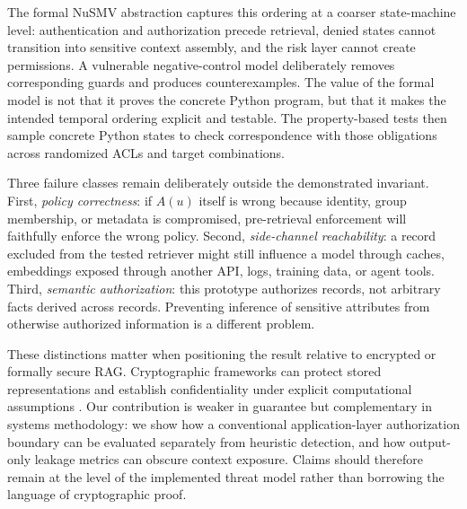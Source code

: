 The formal NuSMV abstraction captures this ordering at a coarser state-machine level: authentication and authorization precede retrieval, denied states cannot transition into sensitive context assembly, and the risk layer cannot create permissions. A vulnerable negative-control model deliberately removes corresponding guards and produces counterexamples. The value of the formal model is not that it proves the concrete Python program, but that it makes the intended temporal ordering explicit and testable. The property-based tests then sample concrete Python states to check correspondence with those obligations across randomized ACLs and target combinations.

Three failure classes remain deliberately outside the demonstrated invariant. First, \emph{policy correctness}: if $A(u)$ itself is wrong because identity, group membership, or metadata is compromised, pre-retrieval enforcement will faithfully enforce the wrong policy. Second, \emph{side-channel reachability}: a record excluded from the tested retriever might still influence a model through caches, embeddings exposed through another API, logs, training data, or agent tools. Third, \emph{semantic authorization}: this prototype authorizes records, not arbitrary facts derived across records. Preventing inference of sensitive attributes from otherwise authorized information is a different problem.

These distinctions matter when positioning the result relative to encrypted or formally secure RAG. Cryptographic frameworks can protect stored representations and establish confidentiality under explicit computational assumptions \cite{zhou2025provable}. Our contribution is weaker in guarantee but complementary in systems methodology: we show how a conventional application-layer authorization boundary can be evaluated separately from heuristic detection, and how output-only leakage metrics can obscure context exposure. Claims should therefore remain at the level of the implemented threat model rather than borrowing the language of cryptographic proof.
